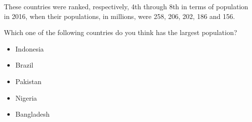 These countries were ranked, respectively, 4th through 8th in terms of population in 2016, when
their populations, in millions, were 258, 206, 202, 186 and 156.

\begin{tcolorbox}
Which one of the following countries do you think has the largest population?

\begin{itemize}
	\item Indonesia
	\item Brazil
	\item Pakistan
	\item Nigeria
	\item Bangladesh
\end{itemize}
\end{tcolorbox}
